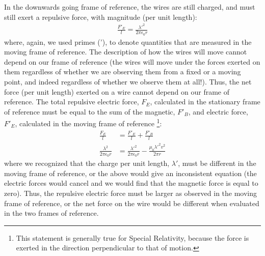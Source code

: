 In the downwards going frame of reference, the wires are still charged, and must still exert a repulsive force, with magnitude (per unit length):
\begin{align*}
\frac{F'_E}{l}=\frac{\lambda'^2}{2\pi \epsilon_0r}
\end{align*}
where, again, we used primes ('), to denote quantities that are measured in the moving frame of reference. The description of how the wires will move cannot depend on our frame of reference (the wires will move under the forces exerted on them regardless of whether we are observing them from a fixed or a moving point, and indeed regardless of whether we observe them at all!). Thus, the net force (per unit length) exerted on a wire cannot depend on our frame of reference. The total repulsive electric force, $F_E$, calculated in the stationary frame of reference must be equal to the sum of the magnetic, $F'_B$, and electric force, $F'_E$, calculated in the moving frame of reference \footnote{This statement is generally true for Special Relativity, because the force is exerted in the direction perpendicular to that of motion.}:
\begin{align*}
\frac{F_E}{l}&=\frac{F'_E}{l}+\frac{F'_B}{l}\\
\frac{\lambda^2}{2\pi \epsilon_0r}&=\frac{\lambda'^2}{2\pi \epsilon_0r}  -\frac{\mu_0 \lambda'^2 v^2}{2\pi r}
\end{align*}
where we recognized that the charge per unit length, $\lambda'$, must be different in the moving frame of reference, or the above would give an inconsistent equation (the electric forces would cancel and we would find that the magnetic force is equal to zero). Thus, the repulsive electric force must be larger as observed in the moving frame of reference, or the net force on the wire would be different when evaluated in the two frames of reference.

